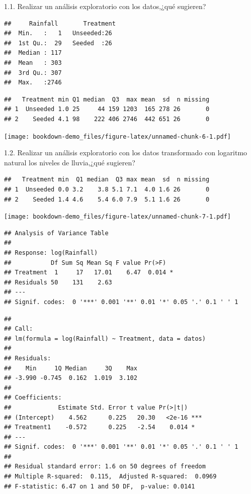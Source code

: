 \documentclass[]{book}
\begin{document}
1.1. Realizar un análisis exploratorio con los datos,¿qué sugieren?

\begin{verbatim}
##     Rainfall       Treatment 
##  Min.   :   1   Unseeded:26  
##  1st Qu.:  29   Seeded  :26  
##  Median : 117                
##  Mean   : 303                
##  3rd Qu.: 307                
##  Max.   :2746
\end{verbatim}

\begin{verbatim}
##   Treatment min Q1 median  Q3  max mean  sd  n missing
## 1  Unseeded 1.0 25     44 159 1203  165 278 26       0
## 2    Seeded 4.1 98    222 406 2746  442 651 26       0
\end{verbatim}

\texttt{[image: bookdown-demo\_files/figure-latex/unnamed-chunk-6-1.pdf]}

1.2. Realizar un análisis exploratorio con los datos transformado con
logaritmo natural los niveles de lluvia,¿qué sugieren?

\begin{verbatim}
##   Treatment min  Q1 median  Q3 max mean  sd  n missing
## 1  Unseeded 0.0 3.2    3.8 5.1 7.1  4.0 1.6 26       0
## 2    Seeded 1.4 4.6    5.4 6.0 7.9  5.1 1.6 26       0
\end{verbatim}

\texttt{[image: bookdown-demo\_files/figure-latex/unnamed-chunk-7-1.pdf]}

\begin{verbatim}
## Analysis of Variance Table
## 
## Response: log(Rainfall)
##           Df Sum Sq Mean Sq F value Pr(>F)  
## Treatment  1     17   17.01    6.47  0.014 *
## Residuals 50    131    2.63                 
## ---
## Signif. codes:  0 '***' 0.001 '**' 0.01 '*' 0.05 '.' 0.1 ' ' 1
\end{verbatim}

\begin{verbatim}
## 
## Call:
## lm(formula = log(Rainfall) ~ Treatment, data = datos)
## 
## Residuals:
##    Min     1Q Median     3Q    Max 
## -3.990 -0.745  0.162  1.019  3.102 
## 
## Coefficients:
##             Estimate Std. Error t value Pr(>|t|)    
## (Intercept)    4.562      0.225   20.30   <2e-16 ***
## Treatment1    -0.572      0.225   -2.54    0.014 *  
## ---
## Signif. codes:  0 '***' 0.001 '**' 0.01 '*' 0.05 '.' 0.1 ' ' 1
## 
## Residual standard error: 1.6 on 50 degrees of freedom
## Multiple R-squared:  0.115,  Adjusted R-squared:  0.0969 
## F-statistic: 6.47 on 1 and 50 DF,  p-value: 0.0141
\end{verbatim}
\end{document}
